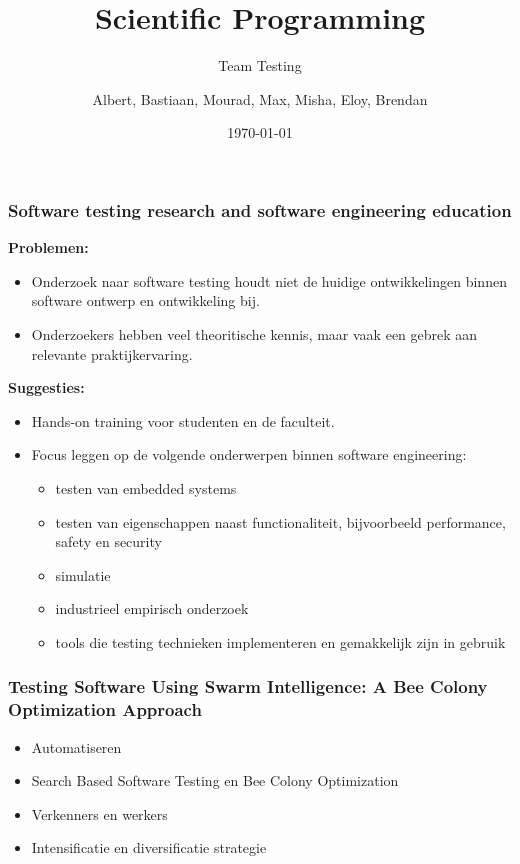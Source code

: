 \documentclass[10pt]{beamer}
\title{Scientific Programming}
\subtitle{Team Testing}
\author{Albert, Bastiaan, Mourad, Max, Misha, Eloy, Brendan}
\date{\today}
\begin{document}
	\begin{frame}
	\titlepage
	\end{frame}
    \begin{frame}
        \frametitle{Software testing research and software engineering education}
        \textbf{Problemen:}
        \begin{itemize}
            \item Onderzoek naar software testing houdt niet de huidige ontwikkelingen binnen software ontwerp en ontwikkeling bij.
            \item Onderzoekers hebben veel theoritische kennis, maar vaak een gebrek aan relevante praktijkervaring.
        \end{itemize}
        
        \textbf{Suggesties:}
        \begin{itemize}
            \item Hands-on training voor studenten en de faculteit.
            \item Focus leggen op de volgende onderwerpen binnen software engineering:
            \begin{itemize}
                \item testen van embedded systems
                \item testen van eigenschappen naast functionaliteit, bijvoorbeeld
                performance, safety en security
                \item simulatie
                \item industrieel empirisch onderzoek
                \item tools die testing technieken implementeren en gemakkelijk zijn in gebruik
            \end{itemize}
        \end{itemize}
    \end{frame}

	\begin{frame}
		\frametitle{Testing Software Using Swarm Intelligence: A Bee Colony Optimization Approach}
		\begin{itemize}
			\item Automatiseren
			\item Search Based Software Testing en Bee Colony Optimization
			\item Verkenners en werkers
			\item Intensificatie en diversificatie strategie
		\end{itemize}
	\end{frame}
\end{document}
